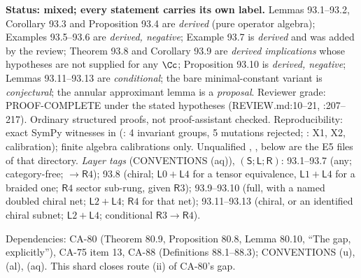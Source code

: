 \textbf{Status: mixed; every statement carries its own label.}  Lemmas 93.1--93.2, Corollary 93.3 and
Proposition 93.4 are \emph{derived} (pure operator algebra); Examples 93.5--93.6 are \emph{derived, negative};
Example 93.7 is \emph{derived} and was added by the review; Theorem 93.8 and Corollary 93.9 are \emph{derived
implications} whose hypotheses are not supplied for any \(\Cc\); Proposition 93.10 is \emph{derived, negative};
Lemmas 93.11--93.13 are \emph{conditional}; the bare minimal-constant variant is \emph{conjectural}; the annular
approximant lemma is a \emph{proposal}.  Reviewer grade: PROOF-COMPLETE under the stated hypotheses
(REVIEW.md:10--21, :207--217).  Ordinary structured proofs, not proof-assistant checked.  Reproducibility: exact
SymPy witnesses in  (:
4 invariant groups, 5 mutations rejected; : X1, X2, calibration); finite algebra calibrations only.
Unqualified , ,  below are the E5 files of that directory.
\emph{Layer tags} (CONVENTIONS (aq)), \((\mathsf S;\mathsf L;\mathsf R)\):
93.1--93.7 (any; category-free; \(\to\mathsf R4\));
93.8 (chiral; \(\mathsf L0{+}\mathsf L4\) for a tensor equivalence, \(\mathsf L1{+}\mathsf L4\) for a braided one;
\(\mathsf R4\) sector sub-rung, given \(\mathsf R3\));
93.9--93.10 (full, with a named doubled chiral net; \(\mathsf L2{+}\mathsf L4\); \(\mathsf R4\) for that net);
93.11--93.13 (chiral, or an identified chiral subnet; \(\mathsf L2{+}\mathsf L4\); conditional \(\mathsf R3\to\mathsf R4\)).

Dependencies: CA-80 (Theorem 80.9, Proposition 80.8, Lemma 80.10, ``The gap, explicitly''), CA-75 item 13,
CA-88 (Definitions 88.1--88.3); CONVENTIONS (u), (al), (aq).  This shard closes route (ii) of CA-80's gap.


